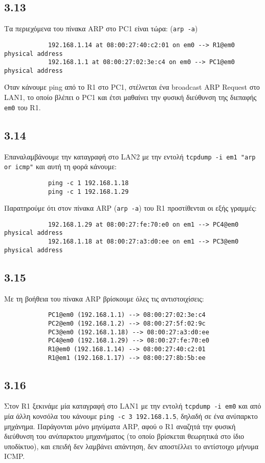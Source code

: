 \documentclass[a4paper, 12pt]{article}
\begin{document}
	\subsection*{3.13}
		Τα περιεχόμενα του πίνακα ARP στο PC1 είναι τώρα: (\verb|arp -a|)

		\begin{verbatim}
			192.168.1.14 at 08:00:27:40:c2:01 on em0 --> R1@em0 physical address
			192.168.1.1 at 08:00:27:02:3e:c4 on em0 --> PC1@em0 physical address
		\end{verbatim}
		
		Όταν κάνουμε ping από το R1 στο PC1, στέλνεται ένα broadcast ARP Request στο LAN1, το οποίο βλέπει ο PC1 και έτσι μαθαίνει την φυσική διεύθυνση της διεπαφής \verb|em0| του R1.

	\subsection*{3.14}
		Επαναλαμβάνουμε την καταγραφή στο LAN2 με την εντολή \verb|tcpdump -i em1 "arp or icmp"| και αυτή τη φορά κάνουμε:
		
		\begin{verbatim}
			ping -c 1 192.168.1.18
			ping -c 1 192.168.1.29
		\end{verbatim}
		
		Παρατηρούμε ότι στον πίνακα ARP (\verb|arp -a|) του R1 προστίθενται οι εξής γραμμές:
		
		\begin{verbatim}
			192.168.1.29 at 08:00:27:fe:70:e0 on em1 --> PC4@em0 physical address
			192.168.1.18 at 08:00:27:a3:d0:ee on em1 --> PC3@em0 physical address
		\end{verbatim}

	\subsection*{3.15}
		Με τη βοήθεια του πίνακα ARP βρίσκουμε όλες τις αντιστοιχίσεις:
		
		\begin{verbatim}
			PC1@em0 (192.168.1.1) --> 08:00:27:02:3e:c4 
			PC2@em0 (192.168.1.2) --> 08:00:27:5f:02:9c 
			PC3@em0 (192.168.1.18) --> 08:00:27:a3:d0:ee
			PC4@em0 (192.168.1.29) --> 08:00:27:fe:70:e0 
			R1@em0 (192.168.1.14) --> 08:00:27:40:c2:01 
			R1@em1 (192.168.1.17) --> 08:00:27:8b:5b:ee 
		\end{verbatim}

	\subsection*{3.16}
		Στον R1 ξεκινάμε μία καταγραφή στο LAN1 με την εντολή \verb|tcpdump -i em0| και από μία άλλη κονσόλα του κάνουμε \verb|ping -c 3 192.168.1.5|, δηλαδή σε ένα ανύπαρκτο μηχάνημα. Παράγονται μόνο μηνύματα ARP, αφού ο R1 αναζητά την φυσική διεύθυνση του ανύπαρκτου μηχανήματος (το οποίο βρίσκεται θεωρητικά στο ίδιο υποδίκτυο), και επειδή δεν λαμβάνει απάντηση, δεν αποστέλλει το αντίστοιχο μήνυμα ICMP.
\end{document}
